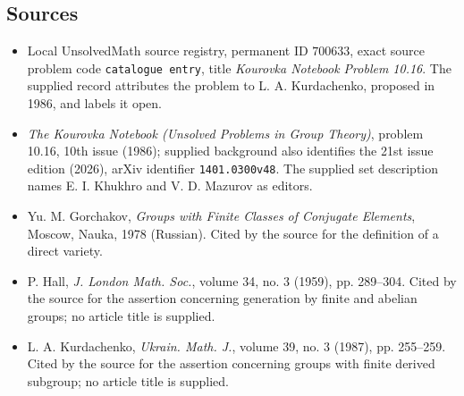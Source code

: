 \documentclass[11pt]{article}
\begin{document}
\subsection{Sources}
\begin{itemize}
\item Local UnsolvedMath source registry, permanent ID \(700633\), exact source problem code \texttt{catalogue entry}, title \emph{Kourovka Notebook Problem 10.16}. The supplied record attributes the problem to L. A. Kurdachenko, proposed in 1986, and labels it open.
\item \emph{The Kourovka Notebook (Unsolved Problems in Group Theory)}, problem 10.16, 10th issue (1986); supplied background also identifies the 21st issue edition (2026), arXiv identifier \texttt{1401.0300v48}. The supplied set description names E. I. Khukhro and V. D. Mazurov as editors.
\item Yu. M. Gorchakov, \emph{Groups with Finite Classes of Conjugate Elements}, Moscow, Nauka, 1978 (Russian). Cited by the source for the definition of a direct variety.
\item P. Hall, \emph{J. London Math. Soc.}, volume 34, no. 3 (1959), pp. 289--304. Cited by the source for the assertion concerning generation by finite and abelian groups; no article title is supplied.
\item L. A. Kurdachenko, \emph{Ukrain. Math. J.}, volume 39, no. 3 (1987), pp. 255--259. Cited by the source for the assertion concerning groups with finite derived subgroup; no article title is supplied.
\end{itemize}
\end{document}
